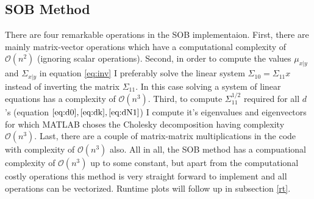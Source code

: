 \documentclass[a4paper]{article}
\begin{document}
\subsection{SOB Method}
There are four remarkable operations in the SOB implementaion. First, there are mainly matrix-vector operations which have a computational complexity of $\mathcal{O}(n^2)$ (ignoring scalar operations). Second, in order to compute the values $\mu_{x|y}$ and $\Sigma_{x|y}$ in equation \ref{eq:inv} I preferably solve the linear system $\Sigma_{10} = \Sigma_{11}x$ instead of inverting the matrix $\Sigma_{11}$. In this case solving a system of linear equations has a complexity of $\mathcal{O}(n^3)$. Third, to compute $\Sigma_{11}^{1/2}$ required for all $d$'s (equation $\ref{eq:d0}, \ref{eq:dk}, \ref{eq:dN1}$) I compute it's eigenvalues and eigenvectors for which MATLAB choses the Cholesky decomposition having complexity $\mathcal{O}(n^3)$. Last, there are a couple of matrix-matrix multiplications in the code with complexity of $\mathcal{O}(n^3)$ also. All in all, the SOB method has a compuational complexity of $\mathcal{O}(n^3)$ up to some constant, but apart from the computational costly operations this method is very straight forward to implement and all operations can be vectorized. Runtime plots will follow up in subsection \ref{rt}.
\end{document}
